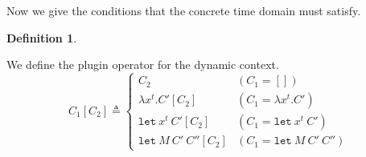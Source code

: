 \documentclass{article}
\newtheorem{definition}{Definition}[section]
\begin{document}
Now we give the conditions that the concrete time domain must satisfy.

\begin{definition}
  
\end{definition}

We define the plugin operator for the dynamic context.
\[
  C_{1}[C_{2}]\triangleq
  \begin{cases}
    C_{2}                           & (C_{1}=[])                       \\
    \lambda x^{t}.C'[C_{2}]         & (C_{1}=\lambda x^{t}.C')         \\
    \mathtt{let}\:x^{t}\:C'[C_{2}]  & (C_{1}=\mathtt{let}\:x^{t}\:C')  \\
    \mathtt{let}\:M\:C'\:C''[C_{2}] & (C_{1}=\mathtt{let}\:M\:C'\:C'')
  \end{cases}
\]
\end{document}
